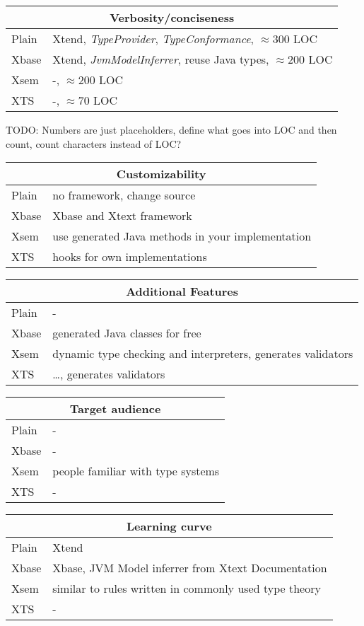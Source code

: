 \begin{frame}
\begin{tabularx}{\linewidth}{ l   X }
\multicolumn{2}{c}{Verbosity/conciseness} \\ \hline
Plain & Xtend, \emph{TypeProvider}, \emph{TypeConformance}, $\approx$300 LOC\\
Xbase & Xtend, \emph{JvmModelInferrer}, reuse Java types, $\approx$200 LOC  \\
Xsem &  -, $\approx$200 LOC \\
XTS & -, $\approx$70 LOC\\
\end{tabularx}
TODO: Numbers are just placeholders, define what goes into LOC and then count,
count characters instead of LOC?


\begin{tabularx}{\linewidth}{ l   X }
\multicolumn{2}{c}{Customizability} \\ \hline
Plain & no framework, change source \\
Xbase & Xbase and Xtext framework \\
Xsem & use generated Java methods in your implementation \\
XTS & hooks for own implementations \\
\end{tabularx}

\begin{tabularx}{\linewidth}{ l   X }
\multicolumn{2}{c}{Additional Features} \\ \hline
Plain & - \\
Xbase & generated Java classes for free \\
Xsem & dynamic type checking and interpreters, generates validators \\
XTS & \ldots, generates validators \\
\end{tabularx}

\begin{tabularx}{\linewidth}{ l   X }
\multicolumn{2}{c}{Target audience} \\ \hline
Plain & - \\
Xbase & - \\
Xsem & people familiar with type systems \\
XTS & - \\
\end{tabularx}

\begin{tabularx}{\linewidth}{ l   X }
\multicolumn{2}{c}{Learning curve} \\ \hline
Plain & Xtend \\
Xbase & Xbase, JVM Model inferrer from Xtext Documentation \\
Xsem & similar to rules written in commonly used type theory \\
XTS & - \\
\end{tabularx}


\end{frame}
